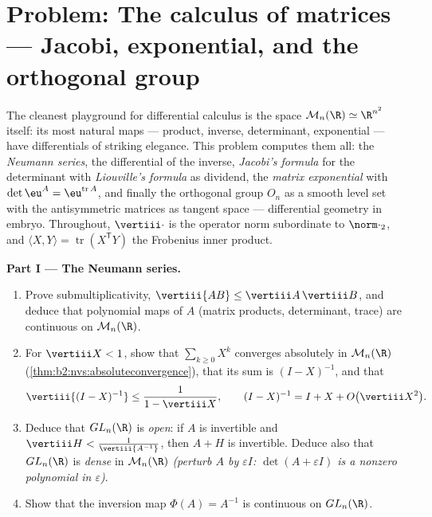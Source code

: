 \section{Problem: The calculus of matrices --- Jacobi,
exponential, and the orthogonal group}

\begin{problem}\label{pb:b2:diffcalc:1}
The cleanest playground for differential calculus is the space
$\mathcal M_n(\R) \simeq \R^{n^2}$ itself: its most natural maps
--- product, inverse, determinant, exponential --- have
differentials of striking elegance. This problem computes them
all: the \emph{Neumann series}, the differential of the inverse,
\emph{Jacobi's formula} for the
determinant with \emph{Liouville's formula} as dividend, the
\emph{matrix exponential} with
$\det\eu^A = \eu^{\operatorname{tr}A}$, and finally the
orthogonal group $O_n$ as a smooth level set with the
antisymmetric matrices as tangent space --- differential
geometry in embryo. Throughout, $\vertiii\cdot$ is the operator
norm subordinate to $\norm\cdot_2$, and $\langle X, Y\rangle =
\operatorname{tr}(X^{\mathsf T}Y)$ the Frobenius inner product.

\medskip
\noindent\textbf{Part I --- The Neumann series.}
\begin{enumerate}
  \item Prove submultiplicativity, $\vertiii{AB} \leq
        \vertiii A\,\vertiii B$, and deduce that polynomial
        maps of $A$ (matrix products, determinant, trace) are
        continuous on $\mathcal M_n(\R)$.
  \item For $\vertiii X < 1$, show that $\sum_{k\geq0}X^k$
        converges absolutely in $\mathcal M_n(\R)$
        (\cref{thm:b2:nvs:absoluteconvergence}), that its sum
        is $(I - X)^{-1}$, and that
        \[
        \vertiii{(I - X)^{-1}} \leq \frac{1}{1 - \vertiii X},
        \qquad
        (I - X)^{-1} = I + X + O\bigl(\vertiii X^2\bigr) .
        \]
  \item Deduce that $GL_n(\R)$ is \emph{open}: if $A$ is
        invertible and $\vertiii H <
        \frac{1}{\vertiii{A^{-1}}}$, then $A + H$ is
        invertible. Deduce also that $GL_n(\R)$ is \emph{dense}
        in $\mathcal M_n(\R)$ \emph{(perturb $A$ by
        $\varepsilon I$: $\det(A + \varepsilon I)$ is a nonzero
        polynomial in $\varepsilon$)}.
  \item Show that the inversion map $\Phi(A) = A^{-1}$ is
        continuous on $GL_n(\R)$.
\end{enumerate}


\end{problem}

